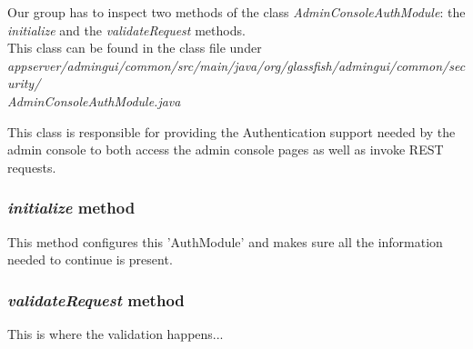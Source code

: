 Our group has to inspect two methods of the class \textit{AdminConsoleAuthModule}: the \textit{initialize} and the \textit{validateRequest} methods.\\
This class can be found in the class file under \textit{appserver/admingui/common/src/main/java/org/glassfish/admingui/common/security/\\AdminConsoleAuthModule.java}

This class is responsible for providing the Authentication support needed by the admin console to both access the admin console pages as well as invoke REST requests.

\subsubsection{\textit{initialize} method}
This method configures this 'AuthModule' and makes sure all the information needed to continue is present.


\subsubsection{\textit{validateRequest} method}
This is where the validation happens...